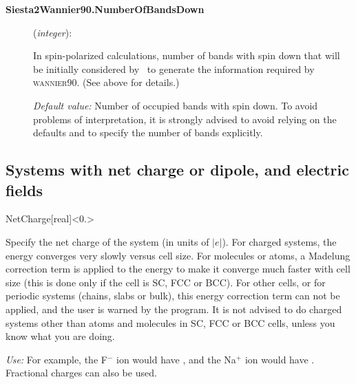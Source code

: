 \begin{description}
\item[\textbf{Siesta2Wannier90.NumberOfBandsDown}] (\textit{integer}):

In spin-polarized calculations, number of bands with spin down that will be
initially considered by \siesta\ to generate the information
required by \textsc{wannier90}. (See above for details.)


\textit{Default value:} {Number of occupied bands with spin down. To
  avoid problems of interpretation, it is strongly advised to avoid
  relying on the defaults and to specify the number of bands
  explicitly. }

\end{description}

\vspace{5pt}
\subsection{Systems with net charge or dipole, and electric fields}

\begin{fdfentry}{NetCharge}[real]<$0.$>%

  Specify the net charge of the system (in units of $|e|$).  For
  charged systems, the energy converges very slowly versus cell
  size. For molecules or atoms, a Madelung correction term is applied
  to the energy to make it converge much faster with cell size (this
  is done only if the cell is SC, FCC or BCC). For other cells, or for
  periodic systems (chains, slabs or bulk), this energy correction
  term can not be applied, and the user is warned by the program. It
  is not advised to do charged systems other than atoms and molecules
  in SC, FCC or BCC cells, unless you know what you are doing.

  \textit{Use:} For example, the F$^-$ ion would have , and the Na$^+$ ion would have .
  Fractional charges can also be used.
  
\end{fdfentry}


